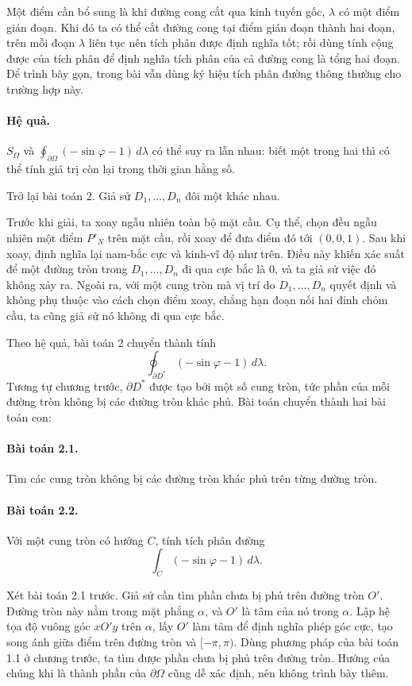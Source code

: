 \documentclass[11pt]{article}
\begin{document}
Một điểm cần bổ sung là khi đường cong cắt qua kinh tuyến gốc, \(\lambda\) có
một điểm gián đoạn. Khi đó ta có thể cắt đường cong tại điểm gián đoạn thành
hai đoạn, trên mỗi đoạn \(\lambda\) liên tục nên tích phân được định nghĩa tốt;
rồi dùng tính cộng được của tích phân để định nghĩa tích phân của cả đường
cong là tổng hai đoạn. Để trình bày gọn, trong bài vẫn dùng ký hiệu tích phân
đường thông thường cho trường hợp này.

\paragraph{Hệ quả.}
\(S_{\Omega}\) và
\(\oint_{\partial\Omega}(-\sin\varphi-1)\,d\lambda\) có thể suy ra lẫn nhau:
biết một trong hai thì có thể tính giá trị còn lại trong thời gian hằng số.

Trở lại bài toán 2. Giả sử \(D_1,\ldots,D_n\) đôi một khác nhau.

Trước khi giải, ta xoay ngẫu nhiên toàn bộ mặt cầu. Cụ thể, chọn đều ngẫu nhiên
một điểm \(P'_N\) trên mặt cầu, rồi xoay để đưa điểm đó tới \((0,0,1)\). Sau
khi xoay, định nghĩa lại nam-bắc cực và kinh-vĩ độ như trên. Điều này khiến
xác suất để một đường tròn trong \(D_1,\ldots,D_n\) đi qua cực bắc là \(0\), và
ta giả sử việc đó không xảy ra. Ngoài ra, với một cung tròn mà vị trí do
\(D_1,\ldots,D_n\) quyết định và không phụ thuộc vào cách chọn điểm xoay, chẳng
hạn đoạn nối hai đỉnh chỏm cầu, ta cũng giả sử nó không đi qua cực bắc.

Theo hệ quả, bài toán 2 chuyển thành tính
\[
  \oint_{\partial D^*}(-\sin\varphi-1)\,d\lambda.
\]
Tương tự chương trước, \(\partial D^*\) được tạo bởi một số cung tròn, tức phần
của mỗi đường tròn không bị các đường tròn khác phủ. Bài toán chuyển thành hai
bài toán con:

\paragraph{Bài toán 2.1.}
Tìm các cung tròn không bị các đường tròn khác phủ trên từng đường tròn.

\paragraph{Bài toán 2.2.}
Với một cung tròn có hướng \(C\), tính tích phân đường
\[
  \int_C(-\sin\varphi-1)\,d\lambda.
\]

Xét bài toán 2.1 trước. Giả sử cần tìm phần chưa bị phủ trên đường tròn \(O'\).
Đường tròn này nằm trong mặt phẳng \(\alpha\), và \(O'\) là tâm của nó trong
\(\alpha\). Lập hệ tọa độ vuông góc \(xO'y\) trên \(\alpha\), lấy \(O'\) làm
tâm để định nghĩa phép góc cực, tạo song ánh giữa điểm trên đường tròn và
\([-\pi,\pi)\). Dùng phương pháp của bài toán 1.1 ở chương trước, ta tìm được
phần chưa bị phủ trên đường tròn. Hướng của chúng khi là thành phần của
\(\partial\Omega\) cũng dễ xác định, nên không trình bày thêm.
\end{document}
